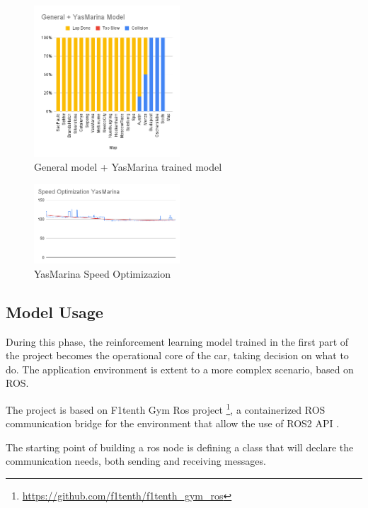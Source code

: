 \documentclass[conference]{IEEEtran}
\begin{document}
\begin{figure}[h]
    \centering
    \includegraphics[width=0.485\textwidth]{img/General + YasMarina Model.png}
    \caption{General model + YasMarina trained model}
    \label{fig:YasMarina_train}
\end{figure}

\begin{figure}[h]
    \centering
    \includegraphics[width=0.485\textwidth]{img/Speed Optimization YasMarina.png}
    \caption{YasMarina  Speed Optimizazion}
    \label{fig:YasMarina_Speed_primization}
\end{figure}

%
%
%
\subsection{Model Usage}

During this phase, the reinforcement learning model trained in the first part of the project becomes the operational core of the car, taking decision on what to do.
%
The application environment is extent to a more complex scenario, based on ROS.

The project is based on F1tenth Gym Ros project \footnote{\url{https://github.com/f1tenth/f1tenth\_gym\_ros}}, a containerized ROS communication bridge for the environment that allow the use of ROS2 API \cite{Ros2}.

The starting point of building a ros node is defining a class that will declare the communication needs, both sending and receiving messages.
\end{document}

